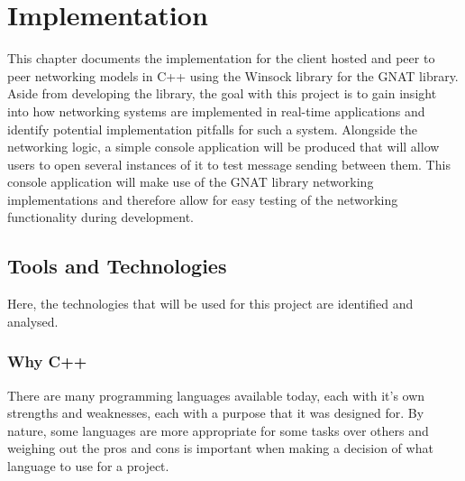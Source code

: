 




\chapter{Implementation}
This chapter documents the implementation for the client hosted and peer to peer networking models in C++ using the Winsock library for the GNAT library. Aside from developing the library, the goal with this project is to gain insight into how networking systems are implemented in real-time applications and identify potential implementation pitfalls for such a system. Alongside the networking logic, a simple console application will be produced that will allow users to open several instances of it to test message sending between them. This console application will make use of the GNAT library networking implementations and therefore allow for easy testing of the networking functionality during development.

\section{Tools and Technologies}
Here, the technologies that will be used for this project are identified and analysed.

\subsection{Why C++}
There are many programming languages available today, each with it's own strengths and weaknesses, each with a purpose that it was designed for. By nature, some languages are more appropriate for some tasks over others and weighing out the pros and cons is important when making a decision of what language to use for a project.

